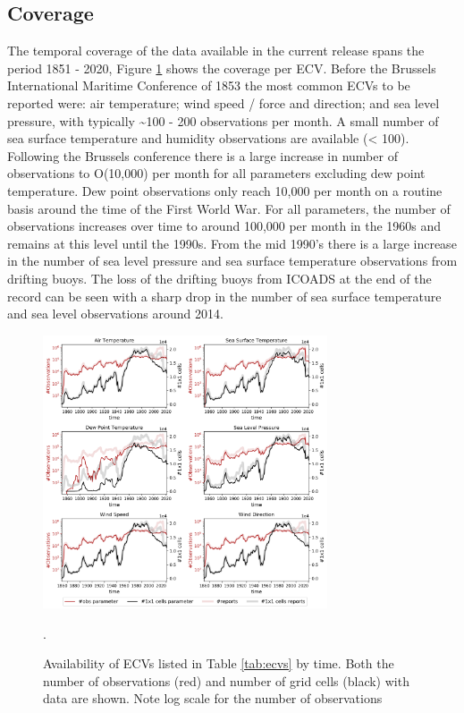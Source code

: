 \subsection{Coverage}
The temporal coverage of the data available in the current release spans the period 1851 - 2020, Figure \ref{fig:ecv_ts1} shows the coverage per ECV. 
Before the Brussels International Maritime Conference of 1853 the most common ECVs to be reported were: air temperature; wind speed / force and direction; and sea level pressure, with typically \sim 100 - 200 observations per month. 
A small number of sea surface temperature and humidity observations are available (< 100).
Following the Brussels conference there is a large increase in number of observations to O(10,000) per month for all parameters excluding dew point temperature. 
Dew point observations only reach 10,000 per month on a routine basis around the time of the First World War.
For all parameters, the number of observations increases over time to around 100,000 per month in the 1960s and remains at this level until the 1990s.
From the mid 1990's there is a large increase in the number of sea level pressure and sea surface temperature observations from drifting buoys.
The loss of the drifting buoys from ICOADS at the end of the record can be seen with a sharp drop in the number of sea surface temperature and sea level observations around 2014.

\begin{figure}[h]
\centering
    \includegraphics[width=0.75\textwidth]{resources/ecv_coverage_ts_grid.png}
    \caption{Availability of ECVs listed in Table \ref{tab:ecvs} by time. Both the number of observations (red) and number of grid cells (black) with data are shown. Note log scale for the number of observations}.
    \label{fig:ecv_ts1}
\end{figure}

